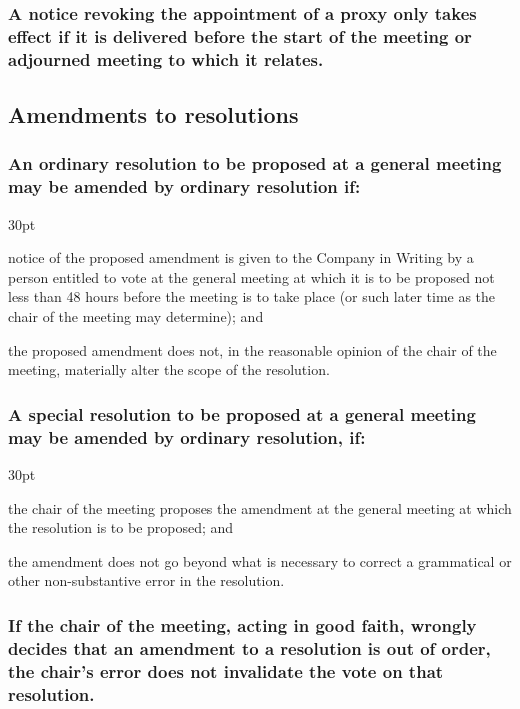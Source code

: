 \documentclass[12pt]{article}
\def\clauseindent{30pt}
\newenvironment{subindentpara}{\begin{adjustwidth}{\clauseindent}{}\begin{hanginglist}}{\end{hanginglist}\end{adjustwidth}}
\begin{document}
\subsubsection[Specifics of revocation of proxy notices]{A notice revoking the appointment of a proxy only takes effect if it is delivered before the start of the meeting or adjourned meeting to which it relates.}

\subsection{Amendments to resolutions}
\subsubsection[Amendments to ordinary resolutions]{An ordinary resolution to be proposed at a general meeting may be amended by ordinary resolution if:}
\begin{subindentpara}
    \item notice of the proposed amendment is given to the Company in Writing by a person entitled to vote at the general meeting at which it is to be proposed not less than 48 hours before the meeting is to take place (or such later time as the chair of the meeting may determine); and
    \item the proposed amendment does not, in the reasonable opinion of the chair of the meeting, materially alter the scope of the resolution.
\end{subindentpara}
\subsubsection[Amendments to special resolutions]{A special resolution to be proposed at a general meeting may be amended by ordinary resolution, if:}
\begin{subindentpara}
    \item the chair of the meeting proposes the amendment at the general meeting at which the resolution is to be proposed; and
    \item the amendment does not go beyond what is necessary to correct a grammatical or other non-substantive error in the resolution.
\end{subindentpara}
\subsubsection[Amendments wrongly considered out of order]{If the chair of the meeting, acting in good faith, wrongly decides that an amendment to a resolution is out of order, the chair's error does not invalidate the vote on that resolution.}
\end{document}
